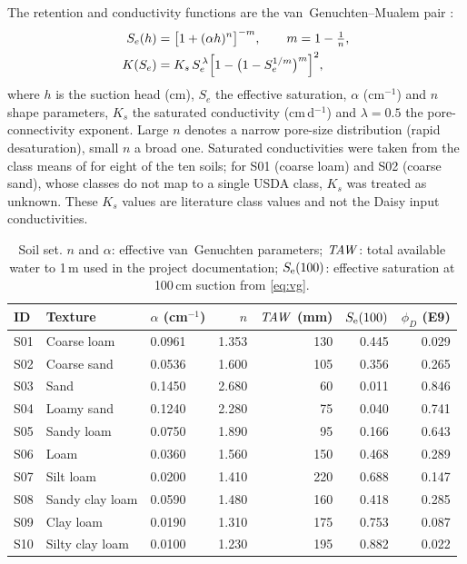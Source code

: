 \documentclass[review,12pt,authoryear]{elsarticle}
\begin{document}
The retention and conductivity functions are the van~Genuchten--Mualem pair \citep{vanGenuchten1980,Mualem1976}:
\begin{align}
S_e(h) &= \bigl[1+(\alpha h)^{n}\bigr]^{-m}, \qquad m = 1-\tfrac{1}{n},\label{eq:vg}\\
K(S_e) &= K_s\, S_e^{\,\lambda}\Bigl[1-\bigl(1-S_e^{1/m}\bigr)^{m}\Bigr]^{2},\label{eq:mualem}
\end{align}
where $h$ is the suction head (cm), $S_e$ the effective saturation, $\alpha$ (cm$^{-1}$) and $n$ shape parameters, $K_s$ the saturated conductivity (cm\,d$^{-1}$) and $\lambda=0.5$ the pore-connectivity exponent. Large $n$ denotes a narrow pore-size distribution (rapid desaturation), small $n$ a broad one. Saturated conductivities were taken from the class means of \citet{Carsel1988} for eight of the ten soils; for S01 (coarse loam) and S02 (coarse sand), whose classes do not map to a single USDA class, $K_s$ was treated as unknown. These $K_s$ values are literature class values and not the Daisy input conductivities.

\begin{table}[!htbp]\centering\small
\caption{Soil set. $n$ and $\alpha$: effective van~Genuchten parameters; $\mathit{TAW}$: total available water to 1\,m used in the project documentation; $S_{\mathrm{e}}(100)$: effective saturation at 100\,cm suction from \cref{eq:vg}.}
\label{tab:soils}
\begin{tabular}{lllrrrr}
\toprule
ID & Texture & $\alpha$ (cm$^{-1}$) & $n$ & $\mathit{TAW}$ (mm) & $S_{\mathrm{e}}(100)$ & $\phi_D$ (E9)\\\midrule
S01 & Coarse loam & 0.0961 & 1.353 & 130 & 0.445 & 0.029\\
S02 & Coarse sand & 0.0536 & 1.600 & 105 & 0.356 & 0.265\\
S03 & Sand & 0.1450 & 2.680 & 60 & 0.011 & 0.846\\
S04 & Loamy sand & 0.1240 & 2.280 & 75 & 0.040 & 0.741\\
S05 & Sandy loam & 0.0750 & 1.890 & 95 & 0.166 & 0.643\\
S06 & Loam & 0.0360 & 1.560 & 150 & 0.468 & 0.289\\
S07 & Silt loam & 0.0200 & 1.410 & 220 & 0.688 & 0.147\\
S08 & Sandy clay loam & 0.0590 & 1.480 & 160 & 0.418 & 0.285\\
S09 & Clay loam & 0.0190 & 1.310 & 175 & 0.753 & 0.087\\
S10 & Silty clay loam & 0.0100 & 1.230 & 195 & 0.882 & 0.022\\\bottomrule
\end{tabular}
\end{table}
\end{document}
